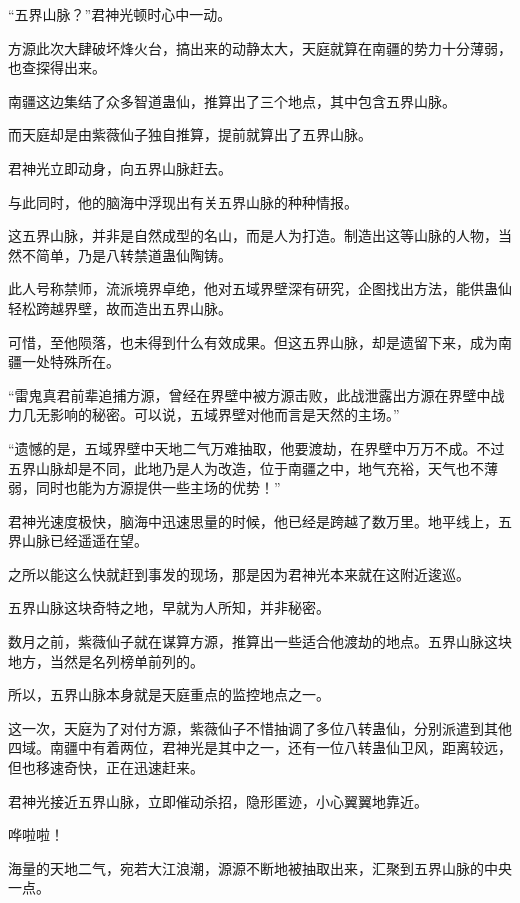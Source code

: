 
\begin{this_body}

“五界山脉？”君神光顿时心中一动。

方源此次大肆破坏烽火台，搞出来的动静太大，天庭就算在南疆的势力十分薄弱，也查探得出来。

南疆这边集结了众多智道蛊仙，推算出了三个地点，其中包含五界山脉。

而天庭却是由紫薇仙子独自推算，提前就算出了五界山脉。

君神光立即动身，向五界山脉赶去。

与此同时，他的脑海中浮现出有关五界山脉的种种情报。

这五界山脉，并非是自然成型的名山，而是人为打造。制造出这等山脉的人物，当然不简单，乃是八转禁道蛊仙陶铸。

此人号称禁师，流派境界卓绝，他对五域界壁深有研究，企图找出方法，能供蛊仙轻松跨越界壁，故而造出五界山脉。

可惜，至他陨落，也未得到什么有效成果。但这五界山脉，却是遗留下来，成为南疆一处特殊所在。

“雷鬼真君前辈追捕方源，曾经在界壁中被方源击败，此战泄露出方源在界壁中战力几无影响的秘密。可以说，五域界壁对他而言是天然的主场。”

“遗憾的是，五域界壁中天地二气万难抽取，他要渡劫，在界壁中万万不成。不过五界山脉却是不同，此地乃是人为改造，位于南疆之中，地气充裕，天气也不薄弱，同时也能为方源提供一些主场的优势！”

君神光速度极快，脑海中迅速思量的时候，他已经是跨越了数万里。地平线上，五界山脉已经遥遥在望。

之所以能这么快就赶到事发的现场，那是因为君神光本来就在这附近逡巡。

五界山脉这块奇特之地，早就为人所知，并非秘密。

数月之前，紫薇仙子就在谋算方源，推算出一些适合他渡劫的地点。五界山脉这块地方，当然是名列榜单前列的。

所以，五界山脉本身就是天庭重点的监控地点之一。

这一次，天庭为了对付方源，紫薇仙子不惜抽调了多位八转蛊仙，分别派遣到其他四域。南疆中有着两位，君神光是其中之一，还有一位八转蛊仙卫风，距离较远，但也移速奇快，正在迅速赶来。

君神光接近五界山脉，立即催动杀招，隐形匿迹，小心翼翼地靠近。

哗啦啦！

海量的天地二气，宛若大江浪潮，源源不断地被抽取出来，汇聚到五界山脉的中央一点。


\end{this_body}
